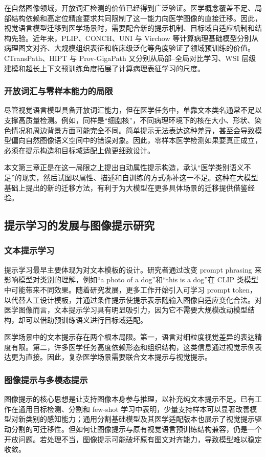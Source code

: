 在自然图像领域，开放词汇检测的价值已经得到广泛验证。医学概念覆盖不足、局部结构依赖和高定位精度要求共同限制了这一能力向医学图像的直接迁移。因此，视觉语言模型迁移到医学场景时，需要配合新的提示机制、目标域自适应机制和结构先验。近年来，PLIP、CONCH、UNI 与 Virchow 等计算病理基础模型分别从病理图文对齐、大规模组织表征和临床级泛化等角度验证了领域预训练的价值\cite{huang2023plip,lu2024conch,chen2024uni,vorontsov2024virchow}。CTransPath、HIPT 与 Prov-GigaPath 又分别从局部--全局对比学习、WSI 层级建模和超长上下文预训练角度拓展了计算病理表征学习的尺度\cite{wang2022ctranspath,chen2022hipt,xu2024gigapath}。

\subsubsection{开放词汇与零样本能力的局限}
尽管视觉语言模型具备开放词汇能力，但在医学任务中，单靠文本类名通常不足以支撑高质量检测。例如，同样是“细胞核”，不同病理环境下的核在大小、形状、染色情况和周边背景方面可能完全不同。简单提示无法表达这种差异，甚至会导致模型偏向自然图像语义空间中的错误对象。因此，零样本医学检测如果要真正成立，必须在提示构造和目标域适配上做更细致设计。

本文第三章正是在这一局限之上提出自动属性提示构造，承认“医学类别语义不足”的现实，然后试图以属性、描述和自训练的方式弥补这一不足。这种在大模型基础上提出的新的迁移方法，有利于为大模型在更多具体场景的迁移提供借鉴经验。

\subsection{提示学习的发展与图像提示研究}
\subsubsection{文本提示学习}
提示学习最早主要体现为对文本模板的设计。研究者通过改变 prompt phrasing 来影响模型对类别的理解，例如“a photo of a dog”和“this is a dog”在 CLIP 类模型中可能带来不同效果。随着研究发展，更多工作开始引入可学习 prompt token，以代替人工设计模板，并通过条件提示使提示表示随输入图像自适应变化\cite{zhou2022cocoop}合法。对医学图像而言，文本提示学习具有明显吸引力，因为它不需要大规模改动模型结构，却可以借助预训练语义进行目标域适配。

医学场景中的文本提示存在两个根本局限。第一，语言对细粒度视觉差异的表达精度有限。第二，许多医学任务高度依赖形态和组织结构，这类信息通过视觉示例表达更为直接。因此，复杂医学场景需要联合文本提示与视觉提示。

\subsubsection{图像提示与多模态提示}
图像提示的核心思想是让支持图像本身参与推理，以补充纯文本提示不足。已有工作在通用目标检测、分割和 few-shot 学习中表明，少量支持样本可以显著改善模型对新类别的感知能力；通用分割基础模型及其医学适配版本也展示了视觉提示驱动分割的可迁移性\cite{kirillov2023sam,ma2024medsam}。但如何让图像提示与原有视觉语言预训练结构兼容，仍是一个开放问题。若处理不当，图像提示可能破坏原有图文对齐能力，导致模型难以稳定收敛。

